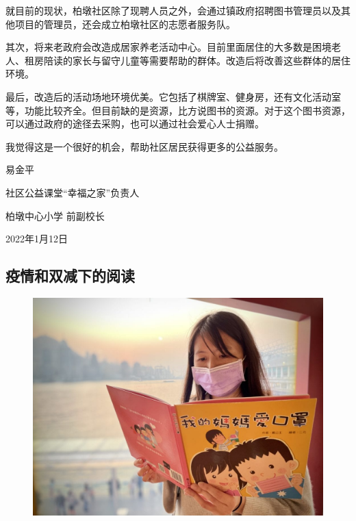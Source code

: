 就目前的现状，柏墩社区除了现聘人员之外，会通过镇政府招聘图书管理员以及其他项目的管理员，还会成立柏墩社区的志愿者服务队。
      
其次，将来老政府会改造成居家养老活动中心。目前里面居住的大多数是困境老人、租房陪读的家长与留守儿童等需要帮助的群体。改造后将改善这些群体的居住环境。

最后，改造后的活动场地环境优美。它包括了棋牌室、健身房，还有文化活动室等，功能比较齐全。但目前缺的是资源，比方说图书的资源。对于这个图书资源，可以通过政府的途径去采购，也可以通过社会爱心人士捐赠。

我觉得这是一个很好的机会，帮助社区居民获得更多的公益服务。







\vspace{10pt}


易金平

社区公益课堂“幸福之家”负责人

柏墩中心小学 前副校长

2022年1月12日
                



\vspace{10pt}

\hline


\vspace{10pt}

{\centering\subsection*{疫情和双减下的阅读}}


\renewcommand{\leftmark}{疫情和双减下的阅读}

\begin{figure}[htbp]

\centering

\includegraphics[width = .5\textwidth]{./ch/zj.jpg}

\end{figure}

